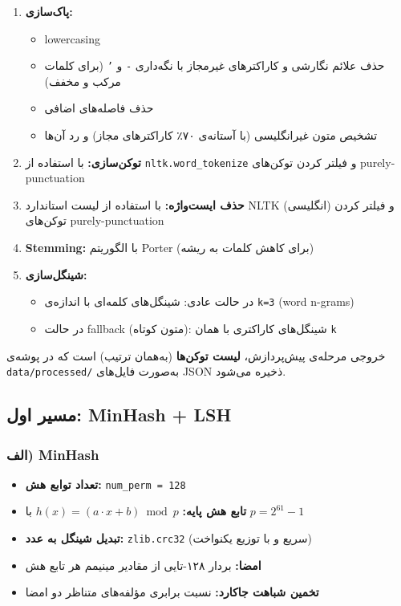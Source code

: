 \documentclass[12pt,a4paper]{article}
\begin{document}
\begin{enumerate}
    \item \textbf{پاک‌سازی:}
    \begin{itemize}
        \item lowercasing
        \item حذف علائم نگارشی و کاراکترهای غیرمجاز با نگه‌داری \texttt{-} و \texttt{'} (برای کلمات مرکب و مخفف)
        \item حذف فاصله‌های اضافی
        \item تشخیص متون غیرانگلیسی (با آستانه‌ی ۷۰٪ کاراکترهای مجاز) و رد آن‌ها
    \end{itemize}
    \item \textbf{توکن‌سازی:} با استفاده از \texttt{nltk.word\_tokenize} و فیلتر کردن توکن‌های purely-punctuation
    \item \textbf{حذف ایست‌واژه:} با استفاده از لیست استاندارد NLTK (انگلیسی) و فیلتر کردن توکن‌های purely-punctuation
    \item \textbf{Stemming:} با الگوریتم Porter (برای کاهش کلمات به ریشه)
    \item \textbf{شینگل‌سازی:}
    \begin{itemize}
        \item در حالت عادی: شینگل‌های کلمه‌ای با اندازه‌ی \texttt{k=3} (word n-grams)
        \item در حالت fallback (متون کوتاه): شینگل‌های کاراکتری با همان \texttt{k}
    \end{itemize}
\end{enumerate}

خروجی مرحله‌ی پیش‌پردازش، \textbf{لیست توکن‌ها} (به‌همان ترتیب) است که در پوشه‌ی \texttt{data/processed/} به‌صورت فایل‌های JSON ذخیره می‌شود.

\subsection{مسیر اول: MinHash + LSH}

\subsubsection*{الف) MinHash}

\begin{itemize}
    \item \textbf{تعداد توابع هش:} \texttt{num\_perm = 128}
    \item \textbf{تابع هش پایه:} $h(x) = (a \cdot x + b) \bmod p$ با $p = 2^{61} - 1$
    \item \textbf{تبدیل شینگل به عدد:} \texttt{zlib.crc32} (سریع و با توزیع یکنواخت)
    \item \textbf{امضا:} بردار ۱۲۸-تایی از مقادیر مینیمم هر تابع هش
    \item \textbf{تخمین شباهت جاکارد:} نسبت برابری مؤلفه‌های متناظر دو امضا
\end{itemize}
\end{document}
